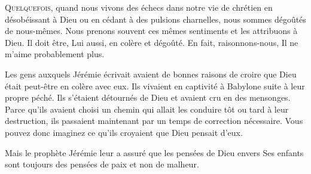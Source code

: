\dvrule








\lettrine{Q}{uelquefois,} quand nous vivons des échecs
 dans notre vie de chrétien en désobéissant à Dieu ou en cédant
 à des pulsions charnelles, nous sommes dégoûtés de nous-mêmes.
 Nous prenons souvent ces mêmes sentiments et les attribuons à Dieu.
 \Og Il doit être, Lui aussi, en colère et dégoûté.
 En fait, 
 raisonnons-nous, 
 Il ne m'aime probablement plus. \Fg{}


Les gens auxquels Jérémie écrivait avaient de bonnes raisons de croire
 que Dieu était peut-être en colère avec eux. Ils vivaient en captivité
 à Babylone suite à leur propre péché. Ils s'étaient détournés de Dieu
 et avaient cru en des mensonges. Parce qu'ils avaient choisi un chemin
 qui allait les conduire tôt ou tard à leur destruction,
 ils passaient maintenant par un temps de correction nécessaire.
 Vous pouvez donc imaginez ce qu'ils croyaient que Dieu pensait d'eux. 

Mais le prophète Jérémie leur a assuré que les pensées de Dieu envers
 Ses enfants sont toujours des pensées de paix et non de malheur. 

